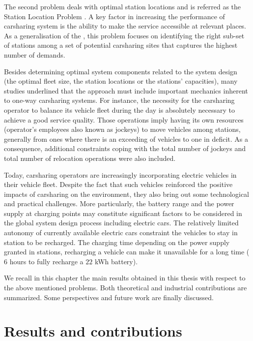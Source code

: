 The second problem deals with optimal station locations and is referred as the Station Location Problem {\SLP}.
A key factor in increasing the performance of carsharing system is the ability to make the service accessible at relevant places.
As a generalisation of the {\SDP}, this problem focuses on identifying the right sub-set of stations among a set of potential carsharing sites that captures the highest number of demands.


\medskip
Besides determining optimal system components related to the system design (\eg the optimal fleet size, the station locations or the stations' capacities), many studies underlined that the approach must include important mechanics inherent to one-way carsharing systems.
For instance, the necessity for the carsharing operator to balance its vehicle fleet during the day is absolutely necessary to achieve a good service quality.
Those operations imply having its own resources (operator's employees also known as jockeys) to move vehicles among stations, generally from ones where there is an exceeding of vehicles to one in deficit.
As a consequence, additional constraints coping with the total number of jockeys and total number of relocation operations were also included.


\medskip
Today, carsharing operators are increasingly incorporating electric vehicles in their vehicle fleet. 
Despite the fact that such vehicles reinforced the positive impacts of carsharing on the environment, they also bring out some technological and practical challenges.
More particularly, the battery range and the power supply at charging points may constitute significant factors to be considered in the global system design process including electric cars.
The relatively limited autonomy of currently available electric cars constraint the vehicles to stay in station to be recharged.
The charging time depending on the power supply granted in stations, recharging a vehicle can make it unavailable for a long time ($6$ hours to fully recharge a $22$ kWh battery).


\bigskip
We recall in this chapter the main results obtained in this thesis with respect to the above mentioned problems.
Both theoretical and industrial contributions are summarized.
Some perspectives and future work are finally discussed.


\newpage
\section{Results and contributions}
